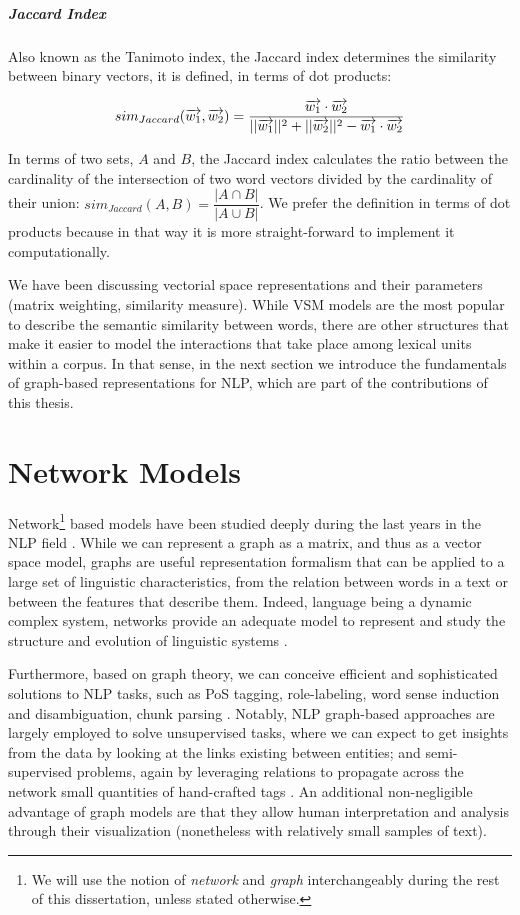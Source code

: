 \subparagraph{Jaccard Index}
Also known as the Tanimoto index, the Jaccard index \cite{jaccard1908nouvelles} determines the similarity between binary vectors, it is defined, in terms of dot products:

\begin{equation}
sim_{Jaccard}(\overrightarrow{w_1},\overrightarrow{w_2}) = \dfrac{\overrightarrow{w_1} \cdot \overrightarrow{w_2}}{||\overrightarrow{w_1}||^2+||\overrightarrow{w_2}||^2 - \overrightarrow{w_1}\cdot\overrightarrow{w_2}}
\vspace{1cm}
\end{equation}

In terms of two sets, $A$ and $B$, the Jaccard index  calculates the ratio between the cardinality of the intersection of two word vectors divided by the cardinality of their union: $sim_{	Jaccard}(A,B)=\dfrac{|A \cap B|}{|A \cup B|}$. We prefer the definition in terms of dot products because in that way it is more straight-forward to implement it computationally.

We have been discussing vectorial space representations and their parameters (matrix weighting, similarity measure). While VSM models are the most popular to describe the semantic similarity between words, there are other structures that make it easier to  model the interactions that take place among lexical units within a corpus. In that sense, in the next section we introduce the fundamentals of graph-based representations for NLP, which are part of the contributions of this thesis.


\section{Network Models}
Network\footnote{We will use the notion of \textit{network} and \textit{graph} interchangeably during the rest of this dissertation, unless stated otherwise.} based models have been studied deeply during the last years in the NLP field  \cite{Mihalcea2011}. While we can represent a graph as a matrix, and thus as a vector space model, graphs are useful representation formalism that can be applied to a large set of linguistic characteristics, from the relation between words in a text or between the features that describe them. Indeed, language being a dynamic complex system, networks provide an adequate model to represent and study the structure and evolution of linguistic systems \cite{Choudhury2009}. 

Furthermore, based on graph theory, we can conceive efficient and sophisticated solutions to NLP tasks, such as PoS tagging, role-labeling, word sense induction and disambiguation, chunk parsing \cite{Mihalcea2011}. Notably, NLP graph-based approaches are largely employed to solve unsupervised tasks, where we can expect to get insights from the data by looking at  the links existing between entities; and semi-supervised problems, again by leveraging relations to propagate across the network small quantities of hand-crafted tags \cite{nastase2015survey}. An additional non-negligible advantage of graph models are that they allow human interpretation and analysis through their visualization (nonetheless with relatively small samples of text). 


